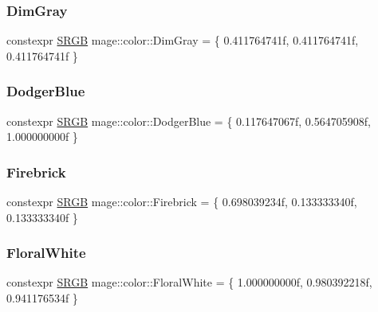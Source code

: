 \hypertarget{namespacemage_1_1color_ab2d11540f6eb4c754eed5fc34c7e6c84}{}\label{namespacemage_1_1color_ab2d11540f6eb4c754eed5fc34c7e6c84} 
\subsubsection{\texorpdfstring{Dim\+Gray}{DimGray}}
{\footnotesize\ttfamily constexpr \hyperlink{structmage_1_1_s_r_g_b}{S\+R\+GB} mage\+::color\+::\+Dim\+Gray = \{ 0.\+411764741f, 0.\+411764741f, 0.\+411764741f \}}

\hypertarget{namespacemage_1_1color_abfa324ef1e603a69303d36526c80b3fa}{}\label{namespacemage_1_1color_abfa324ef1e603a69303d36526c80b3fa} 
\subsubsection{\texorpdfstring{Dodger\+Blue}{DodgerBlue}}
{\footnotesize\ttfamily constexpr \hyperlink{structmage_1_1_s_r_g_b}{S\+R\+GB} mage\+::color\+::\+Dodger\+Blue = \{ 0.\+117647067f, 0.\+564705908f, 1.\+000000000f \}}

\hypertarget{namespacemage_1_1color_aee722564bc5af01bffa36d11da463c7d}{}\label{namespacemage_1_1color_aee722564bc5af01bffa36d11da463c7d} 
\subsubsection{\texorpdfstring{Firebrick}{Firebrick}}
{\footnotesize\ttfamily constexpr \hyperlink{structmage_1_1_s_r_g_b}{S\+R\+GB} mage\+::color\+::\+Firebrick = \{ 0.\+698039234f, 0.\+133333340f, 0.\+133333340f \}}

\hypertarget{namespacemage_1_1color_aa82b9bd5ae0703f8fe79da0fdf163ee9}{}\label{namespacemage_1_1color_aa82b9bd5ae0703f8fe79da0fdf163ee9} 
\subsubsection{\texorpdfstring{Floral\+White}{FloralWhite}}
{\footnotesize\ttfamily constexpr \hyperlink{structmage_1_1_s_r_g_b}{S\+R\+GB} mage\+::color\+::\+Floral\+White = \{ 1.\+000000000f, 0.\+980392218f, 0.\+941176534f \}}

